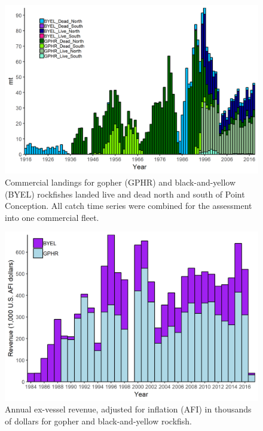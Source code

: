 \documentclass[12pt,]{article}
\begin{document}
\begin{figure}
\centering
\includegraphics{Figures/Catches_livedeadNS_gby.png}
\caption{Commercial landings for gopher (GPHR) and black-and-yellow
(BYEL) rockfishes landed live and dead north and south of Point
Conception. All catch time series were combined for the assessment into
one commercial fleet. \label{fig:Catches_livedeadNS_gby}}
\end{figure}

\begin{figure}
\centering
\includegraphics{Figures/GBY_revenue.png}
\caption{Annual ex-vessel revenue, adjusted for inflation (AFI) in
thousands of dollars for gopher and black-and-yellow rockfish.
\label{fig:GBY_revenue}}
\end{figure}
\end{document}
